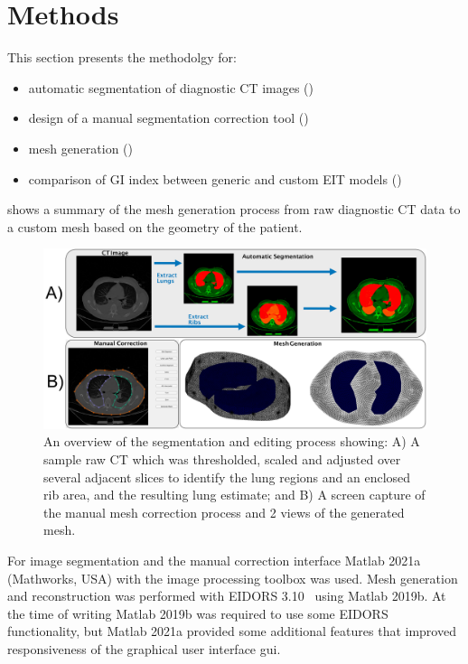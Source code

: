 \section{Methods}
This section presents the methodolgy for:
\begin{itemize}
	\item automatic segmentation of diagnostic CT images ()
	\item design of a manual segmentation correction tool ()
	\item mesh generation ()
	\item comparison of GI index between generic and custom EIT models ()
\end{itemize}
 shows a summary of the mesh generation process from raw diagnostic CT 
data to a custom mesh based on the geometry of the patient.
\begin{figure}
	\centering
	\includegraphics[width=\textwidth]{chapter5-CT_to_mesh/imgs/methods_figure.pdf}
	\caption[Mesh generation method overiew.]{\label{fig:segment_overview}%
	An overview of the segmentation and editing process showing: 
	A) A sample raw CT which was thresholded, scaled and adjusted over several 
	adjacent slices to identify
	the lung regions and an enclosed rib area, and the resulting lung estimate; and
	B) A screen  capture of the manual mesh correction process and 2 views of the generated
	mesh.
	}
\end{figure}

For image segmentation and the manual correction interface
Matlab 2021a (Mathworks, USA) with the image 
processing toolbox was used.
Mesh generation and reconstruction was performed with 
EIDORS 3.10~\parencite{adler_eidors_2017} using Matlab 2019b.
At the time of writing Matlab 2019b was required to 
use some EIDORS functionality, but Matlab 2021a provided some additional 
features that improved responsiveness of the 
graphical user interface \acrshort{gui}.

